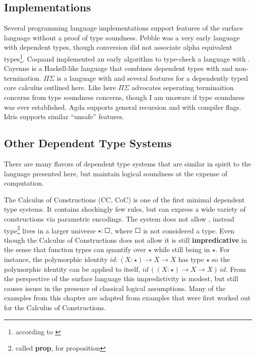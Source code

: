 \subsection{Implementations}

Several programming language implementations support features of the surface language without a proof of type soundness.
Pebble\cite{10.1007/3-540-13346-1_1} was a very early language with dependent types, though conversion did not associate alpha equivalent types\footnote{according to \cite{Reinhold89typecheckingis}}.
Coquand implemented an early \bidir{} algorithm to type-check a language with \tit{}\cite{COQUAND1996167}.
Cayenne\cite{10.1145/289423.289451} is a Haskell-like language that combines dependent types with \tit{} and non-termination.
$\Pi$$\Sigma$\cite{10.1007/978-3-642-12251-4_5} is a language with \tit{} and several features for a dependently typed core calculus outlined here.
Like here $\Pi$$\Sigma$ advocates seperating terminaition concerns from type soundness concerns, though I am unaware if type soundness was ever established.
Agda supports general recursion and \tit{} with compiler flags.
Idris supports similar ``unsafe'' features.

\subsection{Other Dependent Type Systems}

There are many flavors of dependent type systems that are similar in spirit to the language presented here, but maintain logical soundness at the expense of computation.

The Calculus of Constructions (\ac{CC}, CoC)\cite{10.1016/0890-5401(88)90005-3} is one of the first minimal dependent type systems.
It contains shockingly few rules, but can express a wide variety of constructions via parametric encodings.
The system does not allow \tit{}, instead type\footnote{called \textbf{prop}, for proposition} lives in a larger universe $\star:\Square$, where $\Square$ is not considered a type.
Even though the Calculus of Constructions does not allow \tit{} it is still \textbf{impredicative} in the sense that function types can quantify over $\star$ while still being in $\star$.
For instance, the polymorphic identity $id:(X:\star)\rightarrow X\rightarrow X$ has type $\star$ so the polymorphic identity can be applied to itself, $id\,\left((X:\star)\rightarrow X\rightarrow X\right)\,id$.
From the perspective of the surface language this impredictivity is modest, but still causes issues in the presence of classical logical assumptions. 
Many of the examples from this chapter are adapted from examples that were first worked out for the Calculus of Constructions.

